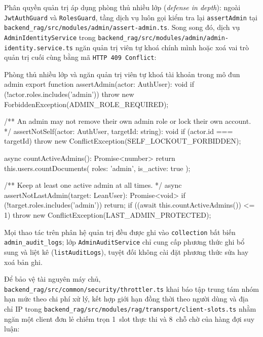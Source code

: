 Phân quyền quản trị áp dụng phòng thủ nhiều lớp (\textit{defense in depth}): ngoài \texttt{JwtAuth\allowbreak{}Guard} và \texttt{Roles\allowbreak{}Guard}, tầng dịch vụ luôn gọi kiểm tra lại \texttt{assertAdmin} tại \texttt{backend\_\allowbreak{}rag/\allowbreak{}src/\allowbreak{}modules/\allowbreak{}admin/\allowbreak{}assert-\allowbreak{}admin.\allowbreak{}ts}. Song song đó, dịch vụ \texttt{Admin\allowbreak{}Identity\allowbreak{}Service} trong \texttt{backend\_\allowbreak{}rag/\allowbreak{}src/\allowbreak{}modules/\allowbreak{}admin/\allowbreak{}admin-\allowbreak{}identity.\allowbreak{}service.\allowbreak{}ts} ngăn quản trị viên tự khoá chính mình hoặc xoá vai trò quản trị cuối cùng bằng mã \texttt{HTTP 409 Conflict}:

\begin{tsbox}{Phòng thủ nhiều lớp và ngăn quản trị viên tự khoá tài khoản trong mô đun admin}
export function assertAdmin(actor: AuthUser): void {
  if (!actor.roles.includes('admin')) {
    throw new ForbiddenException(ADMIN_ROLE_REQUIRED);
  }
}

/** An admin may not remove their own admin role or lock their own account. */
assertNotSelf(actor: AuthUser, targetId: string): void {
  if (actor.id === targetId) {
    throw new ConflictException(SELF_LOCKOUT_FORBIDDEN);
  }
}

async countActiveAdmins(): Promise<number> {
  return this.users.countDocuments({ roles: 'admin', is_active: true });
}

/** Keep at least one active admin at all times. */
async assertNotLastAdmin(target: LeanUser): Promise<void> {
  if (!target.roles.includes('admin')) return;
  if ((await this.countActiveAdmins()) <= 1) {
    throw new ConflictException(LAST_ADMIN_PROTECTED);
  }
}
\end{tsbox}

Mọi thao tác trên phân hệ quản trị đều được ghi vào \texttt{collection} bất biến \texttt{admin\_\allowbreak{}audit\_\allowbreak{}logs}; lớp \texttt{AdminAudit\allowbreak{}Service} chỉ cung cấp phương thức ghi bổ sung và liệt kê (\texttt{listAudit\allowbreak{}Logs}), tuyệt đối không cài đặt phương thức sửa hay xoá bản ghi.

Để bảo vệ tài nguyên máy chủ, \texttt{backend\_\allowbreak{}rag/\allowbreak{}src/\allowbreak{}common/\allowbreak{}security/\allowbreak{}throttler.\allowbreak{}ts} khai báo tập trung tám nhóm hạn mức theo chi phí xử lý, kết hợp giới hạn đồng thời theo người dùng và địa chỉ IP trong \texttt{backend\_\allowbreak{}rag/\allowbreak{}src/\allowbreak{}modules/\allowbreak{}rag/\allowbreak{}transport/\allowbreak{}client-\allowbreak{}slots.\allowbreak{}ts} nhằm ngăn một client đơn lẻ chiếm trọn 1~slot thực thi và 8~chỗ chờ của hàng đợi suy luận:

